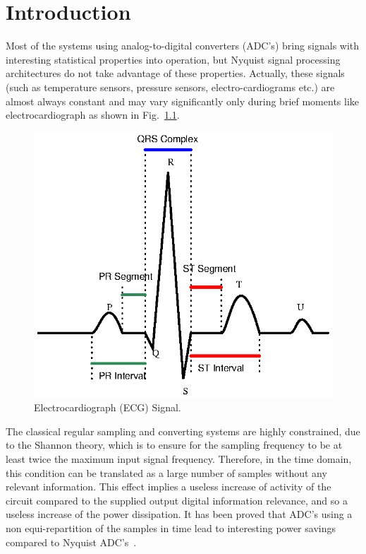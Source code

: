 \chapter{Introduction}

\par
\hspace{1.2cm} Most of the systems using analog-to-digital converters (ADC's) bring signals with interesting statistical properties into operation, but Nyquist signal processing architectures do not take advantage of these properties. Actually, these signals (such as temperature sensors, pressure sensors, electro-cardiograms etc.) are almost always constant and may vary significantly only during brief moments like electrocardiograph as shown in Fig.~\ref{fig:ECG}. 

\begin{figure}[H]
	\begin{center}
		\includegraphics[scale=0.80]{./Figures/ECG.ps}
		\caption{Electrocardiograph (ECG) Signal.}
		\label{fig:ECG}
	\end{center}
\end{figure}

\par
\hspace{0.6cm} The classical regular sampling and converting systems are highly constrained, due to the Shannon theory, which is to ensure for the sampling frequency to be at least twice the maximum input signal frequency. Therefore, in the time domain, this condition can be translated as a large number of samples without any relevant information. This effect implies a useless increase of activity of the circuit compared to the supplied output digital information relevance, and so a useless increase of the power dissipation. It has been proved that ADC's using a non equi-repartition of the samples in time lead to interesting power savings compared to Nyquist ADC's~\cite{1522735}.



